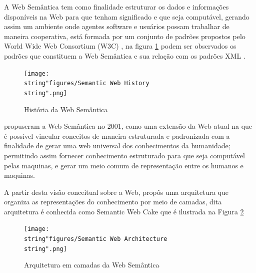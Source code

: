 A Web Semântica tem como finalidade estruturar os dados e informações
disponíveis na Web para que tenham significado e que seja computável,
gerando assim um ambiente onde agentes software e usuários possam
trabalhar de maneira cooperativa, está formada por um conjunto de
padrões propostos pelo \foreignlanguage{english}{World Wide Web Consortium}
(W3C) , na figura \ref{fig:Semantic_Web_History}
podem ser observados os padrões que constituem a Web Semântica e sua
relação com os padrões \foreignlanguage{english}{XML} . 

\begin{figure}[H]
\begin{centering}
\texttt{[image: \\string"figures/Semantic Web History\\string".png]}
\par\end{centering}
\caption{História da Web Semântica \label{fig:Semantic_Web_History}}
\end{figure}

\citet{bernerslee2001} propuseram a Web Semântica no 2001, como uma
extensão da Web atual na que é possível vincular conceitos de maneira
estruturada e padronizada com a finalidade de gerar uma web universal
dos conhecimentos da humanidade; permitindo assim fornecer conhecimento
estruturado para que seja computável pelas maquinas, e gerar um meio
comum de representação entre os humanos e maquinas.

A partir desta visão conceitual sobre a Web, \citet{bernerslee2001}
propôs uma arquitetura que organiza as representações do conhecimento
por meio de camadas, dita arquitetura é conhecida como \foreignlanguage{english}{Semantic
Web Cake} que é ilustrada na Figura \ref{fig:Web-Semantic-Architecture}

\begin{figure}
\centering{}\texttt{[image: \\string"figures/Semantic Web Architecture\\string".png]}\caption{Arquitetura em camadas da Web Semântica\label{fig:Web-Semantic-Architecture}}
\end{figure}

